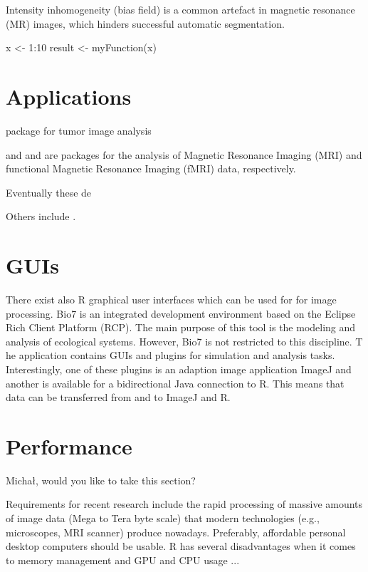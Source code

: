 Intensity inhomogeneity (bias field) is a common artefact in 
magnetic resonance (MR) images, which hinders successful automatic segmentation. \citep{ivanovska_efficient_2016}


\begin{example}
  x <- 1:10
  result <- myFunction(x)
\end{example}


\section{Applications}

 package \citep{failmezger_crimage:_2012} for tumor image analysis

 \citep{marchini_analyzefmri:_2002} and  
\citep{polzehl_fmri:_2007} and are packages for the analysis of Magnetic 
Resonance Imaging (MRI) and functional Magnetic Resonance Imaging (fMRI) data, 
respectively.

Eventually these de 

Others include  \citep{dunning_beadarray:_2006, frery_introduction_2013}.

\section{GUIs}

There exist also R graphical user interfaces \citep{rodiger_rkward:_2012} which can be used for for image processing. 
Bio7 is an integrated development environment based on the Eclipse Rich Client 
Platform (RCP). The main purpose of this tool is the modeling and analysis of 
ecological systems. However, Bio7 is not restricted to this discipline. T
he application contains GUIs and plugins for simulation and analysis tasks. 
Interestingly, one of these plugins is an adaption image application ImageJ 
and another is available for a bidirectional Java connection to R. This 
means that data can be transferred from and to ImageJ and R.

\section{Performance}

Micha\l{}, would you like to take this section?


Requirements for recent research include the rapid processing of massive amounts 
of image data (Mega to Tera byte scale) that modern technologies (e.g., 
microscopes, MRI scanner) produce nowadays. Preferably, affordable personal desktop
computers should be usable. R has several disadvantages when it comes to memory management
and GPU and CPU usage ...

